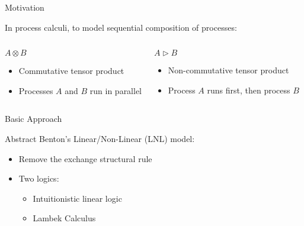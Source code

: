 \documentclass{beamer}
\begin{document}
\begin{frame}{Motivation}

In process calculi, to model sequential composition of processes:

\begin{columns}
  \begin{block}{$A\otimes B$}
  \begin{itemize}
  \item Commutative tensor product
  \item Processes $A$ and $B$ run in parallel
  \end{itemize}
  \end{block}
  \begin{block}{$A\triangleright B$}
  \begin{itemize}
  \item Non-commutative tensor product
  \item Process $A$ runs first, then process $B$
  \end{itemize}
  \end{block}
\end{columns}

\end{frame}

\begin{frame}{Basic Approach}

Abstract Benton's Linear/Non-Linear (LNL) model:
\begin{itemize}
\item Remove the exchange structural rule
\item Two logics:
      \begin{itemize}
      \item Intuitionistic linear logic
      \item Lambek Calculus
      \end{itemize}
\end{itemize}

\end{frame}
\end{document}
